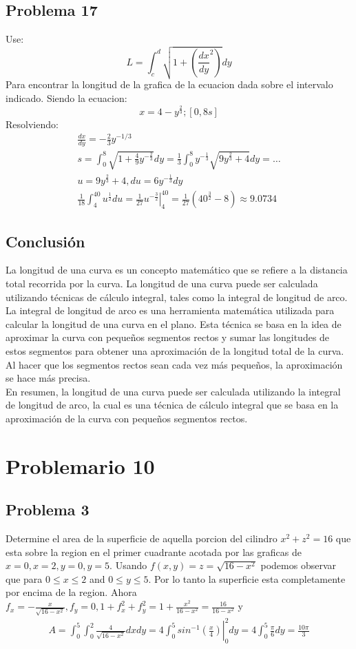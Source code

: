 \documentclass{article}
\begin{document}
\subsection{Problema 17}
Use:
$$
L=\int_{c}^{d}\sqrt{1+\left(\frac{dx}{dy}^2\right)}dy
$$
Para encontrar la longitud de la grafica de la ecuacion dada sobre el intervalo indicado.
Siendo la ecuacion:
$$
x = 4-y^{\frac{2}{3}};[0,8s]
$$
Resolviendo:
\begin{align*}
  \frac{dx}{dy}=-\frac{2}{3}y^{-1/3}\\ s = \int_{0}^{8}\sqrt{1+\frac{4}{9}y^{-\frac{2}{3}}}dy = \frac{1}{3}\int_{0}^{8}y^{-\frac{1}{3}}\sqrt{9y^{\frac{2}{3}}+4}dy = \dots \\ u =9y^{\frac{2}{3}}+4, du =6y^{-\frac{1}{3}}dy \\ \frac{1}{18}\int_{4}^{40}u^{\frac{1}{2}} du = \left.\frac{1}{27}u^{-\frac{3}{2}}\right|_4^{40} = \frac{1}{27}(40^{\frac{3}{2}}-8)\approx 9.0734
\end{align*}
\subsection{Conclusión}
La longitud de una curva es un concepto matemático que se refiere a la distancia total recorrida por la curva. La longitud de una curva puede ser calculada utilizando técnicas de cálculo integral, tales como la integral de longitud de arco.
\\
La integral de longitud de arco es una herramienta matemática utilizada para calcular la longitud de una curva en el plano. Esta técnica se basa en la idea de aproximar la curva con pequeños segmentos rectos y sumar las longitudes de estos segmentos para obtener una aproximación de la longitud total de la curva. Al hacer que los segmentos rectos sean cada vez más pequeños, la aproximación se hace más precisa.
\\
En resumen, la longitud de una curva puede ser calculada utilizando la integral de longitud de arco, la cual es una técnica de cálculo integral que se basa en la aproximación de la curva con pequeños segmentos rectos.

\section{Problemario 10}
\subsection{Problema 3}
Determine el area de la superficie de aquella porcion del cilindro $x^2+z^2=16$ que esta sobre la region en el primer cuadrante acotada por las graficas de $x=0, x=2, y=0,y=5$.
Usando $f(x,y)=z=\sqrt{16-x^2}$ podemos observar que para $0\leq x\leq2$ and $0\leq y\leq5$. Por lo tanto la superficie esta completamente por encima de la region. Ahora $f_x = - \frac{x}{\sqrt{16-x^2}}, f_y = 0, 1+f_x^2+f_y^2 = 1+\frac{x^2}{16-x^2}=\frac{16}{16-x^2}$  y 
\begin{align*}
  A =\int_{0}^{5}\int_{0}^{2}\frac{4}{\sqrt{16-x^2}}dxdy = \left.4 \int_{0}^{5}sin^{-1}(\frac{x}{4})\right|_0^2dy=4\int_{0}^{5}\frac{\pi}{6}dy=\frac{10\pi}{3}
\end{align*}
\end{document}
